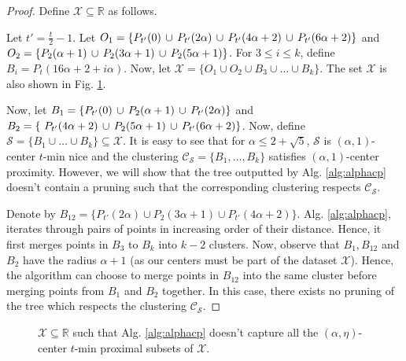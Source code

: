 \documentclass[anon,12pt]{colt2016} %
\newcommand{\mc}{\mathcal}
\begin{document}
\begin{proof}
Define $\mc X \subseteq \mathbb{R}$ as follows. 

Let $t' = \frac{t}{2}-1$. Let $O_1 = \{P_{t'}(0) \thinspace\cup\thinspace P_{t'}(2\alpha) \thinspace\cup\thinspace P_{t'}(4\alpha+2) \thinspace\cup\thinspace P_{t'}(6\alpha+2)\}$ and $O_2 = \{P_{2}(\alpha+1) \thinspace\cup\thinspace P_{2}(3\alpha+1) \thinspace\cup\thinspace P_{2}(5\alpha+1) \}$. For $3\le i\le k$, define $B_i = P_t (16\alpha+2+i \alpha )$. Now, let $\mc X = \{ O_1 \cup O_2 \cup B_3 \cup \ldots \cup B_k \}$. The set $\mc X$ is also shown in Fig. \ref{fig:algAlphacp}.

Now, let $B_1 = \{P_{t'}(0) \thinspace\cup\thinspace  P_{2}(\alpha+1) \thinspace\cup\thinspace P_{t'}(2\alpha) \}$ and $B_2 = \{\ P_{t'}(4\alpha+2) \thinspace\cup\thinspace P_{2}(5\alpha+1)\thinspace\cup\thinspace P_{t'}(6\alpha+2)\}$. Now, define $\mc S = \{B_1 \cup \ldots \cup B_k\} \subseteq \mc X$. It is easy to see that for $\alpha \le 2+\sqrt{5}$, $\mc S$ is $(\alpha, 1)$-center $t$-min nice and the clustering $\mc C_{\mc S} = \{B_1, \ldots, B_k\}$ satisfies $(\alpha, 1)$-center proximity. However, we will show that the tree outputted by Alg. \ref{alg:alphacp} doesn't contain a pruning such that the corresponding clustering respects $\mc C_{\mc S}$.

Denote by $B_{12} = \{P_{t'}(2\alpha) \cup P_{2}(3\alpha+1) \cup P_{t'}(4\alpha+2) \}$. Alg. \ref{alg:alphacp}, iterates through pairs of points in increasing order of their distance. Hence, it first merges points in $B_3$ to $B_k$ into $k-2$ clusters. Now, observe that $B_1, B_{12}$ and $B_{2}$ have the radius $\alpha + 1$ (as our centers must be part of the dataset $\mc X$). Hence, the algorithm can choose to merge points in $B_{12}$ into the same cluster before merging points from $B_1$ and $B_2$ together. In this case, there exists no pruning of the tree which respects the clustering $\mc C_{\mc S}$.
\end{proof}

\begin{figure}

\caption{$\mc X \subseteq \mathbb{R}$ such that Alg. \ref{alg:alphacp} doesn't capture all the $(\alpha, \eta)$-center $t$-min proximal subsets of $\mc X$.}
\label{fig:algAlphacp}
\end{figure}
\end{document}
